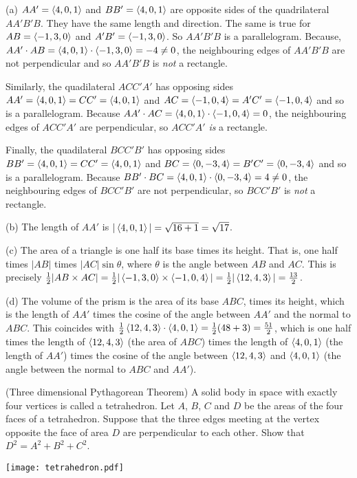 \begin{solution}
(a) $AA'=\left< 4,0,1\right> $ and $BB'=\left< 4,0,1\right> $ are opposite sides
of the quadrilateral $AA'B'B$. They have the same length 
and direction. The same is true for $AB=\left< -1,3,0\right> $ and 
$A'B'=\left< -1,3,0\right> $. So $AA'B'B$ is a parallelogram. Because, 
$AA'\cdot AB=\left< 4,0,1\right> \cdot\left< -1,3,0\right> =-4\ne 0$, 
the neighbouring edges of $AA'B'B$ are not perpendicular and so $AA'B'B$ 
is \emph{not} a rectangle.

Similarly, the quadilateral $ACC'A'$ has opposing sides
$AA'=\left< 4,0,1\right> =CC'=\left< 4,0,1\right> $ and 
$AC=\left< -1,0,4\right> =A'C'=\left< -1,0,4\right> $ and so is
a parallelogram. Because $AA'\cdot AC=\left< 4,0,1\right> \cdot\left< -1,0,4\right> = 0$, the neighbouring edges of $ACC'A'$ are perpendicular, so
$ACC'A'$ \emph{is} a rectangle.

Finally, the quadilateral $BCC'B'$ has opposing sides
$BB'=\left< 4,0,1\right> =CC'=\left< 4,0,1\right> $ and 
$BC=\left< 0,-3,4\right> =B'C'=\left< 0,-3,4\right> $ and so is
a parallelogram. Because $BB'\cdot BC=\left< 4,0,1\right> \cdot\left< 0,-3,4\right> 
= 4\ne 0$, the neighbouring edges of $BCC'B'$ are not perpendicular, so 
$BCC'B'$ is \emph{not} a rectangle.

(b) The length of $AA'$ is $|\left< 4,0,1\right> |=\sqrt{16+1}=\sqrt{17}$.

(c) The area of a triangle is one half its base times its height. 
That is, one half times $|AB|$ times $|AC|\sin\theta$, where 
$\theta$ is the angle between $AB$ and $AC$. This is precisely 
$\tfrac{1}{2} |AB\times AC|=\tfrac{1}{2}|\left< -1,3,0\right> \times\left< -1,0,4\right> | 
=\tfrac{1}{2} |\left< 12,4,3\right>|=\frac{13}{2}$.

(d) The volume of the prism is the area of its base $ABC$,
 times its height, which is the length of $AA'$ times the cosine of the
angle between $AA'$ and the normal to $ABC$. This coincides with
$\tfrac{1}{2} \left< 12,4,3\right> \cdot\left< 4,0,1\right> =\tfrac{1}{2}(48+3)=\frac{51}{2}$, which is 
one half times the length of $\left< 12,4,3\right> $ (the area of $ABC$) 
times the length of $\left< 4,0,1\right> $ (the length of $AA'$) times the 
cosine of the angle between $\left< 12,4,3\right> $ and
$\left< 4,0,1\right> $ (the angle between the normal to $ABC$ and $AA'$).

\end{solution}

\begin{question}\label{prb pythagorous}
(Three dimensional Pythagorean Theorem) A solid body in space 
with exactly four vertices is called a tetrahedron. Let $A$, $B$, $C$ and
$D$ be the areas of the four faces of a tetrahedron. Suppose that the
three edges meeting at the vertex opposite the face of area $D$ are 
perpendicular to each other. Show that $D^2=A^2+B^2+C^2$.

\begin{center}
     \texttt{[image: tetrahedron.pdf]}
\end{center}

\end{question}

